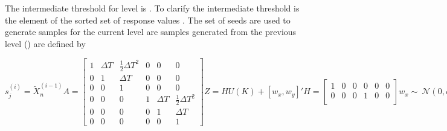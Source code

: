 \documentclass[journal]{IEEEtran}
\begin{document}
\noindent The intermediate threshold for level  is . To clarify the intermediate threshold is the  element of the sorted set of response values . The set of seeds  are used to generate samples for the current level  are samples generated from the previous level () are defined by

\begin {equation}
	s_{j}^{(i)} = \tilde{X}_{n}^{(i-1)}
\label{eq:seeds}

A = \begin{bmatrix}
	1 & \Delta T & \frac{1}{2}\Delta T^{2} & 0 & 0 & 0\\	
	0 &  1 & \Delta T & 0 & 0 & 0\\	
	0 &  0 & 1 & 0 & 0 & 0 \\
	0 &  0 & 0 & 1 & \Delta T & \frac{1}{2}\Delta T^{2} \\
	0 &  0 & 0 & 0 & 1 & \Delta T \\
	0 &  0 & 0 & 0 & 0 & 1 
\end{bmatrix}
\label{eq:transition_matrix}

	Z = HU(K) + [w_{x},w_{y}]'
	\label{eq:measurement}

H = \begin{bmatrix}
1 & 0 & 0 & 0 & 0 & 0\\	
0 & 0 & 0 & 1 & 0 & 0\\	
\end{bmatrix}
 \label{eq:measurement_matrix} 

w_{x} \sim{~} \mathcal{N}(0,\sigma_{x})
\label{eq:noise_x}

w_{y} \sim{~} \mathcal{N}(0,\sigma_{y})
\label{eq:noise_y}

\hat{U}(K+1) = A\hat{U}(K)
\label{eq:kalman_dyn}

\hat{S}(K+1) = A\hat{S}(K)A^{T} + Q
\label{eq:kalman_error_predict}

	Q = \begin{bmatrix}		
			 Q_{\sigma}\frac{\sigma_{a_{x}}^{2}}{\Delta T} & 0 \\
			 0 & Q_{\sigma}\frac{\sigma_{a_{y}}^{2}}{\Delta T}
		\end{bmatrix}

	Q_{\sigma} = \begin{bmatrix}
	\frac{1}{20}\Delta T^{5} & \frac{1}{8}\Delta T^{4} & \frac{1}{6}\Delta T^{3} \\	
	\frac{1}{8}\Delta T^{4} & \frac{1}{3}\Delta T^{3} & \frac{1}{2}\Delta T^{2} \\	
	\frac{1}{6}\Delta T^{3} & \frac{1}{2}\Delta T^{2} & \Delta T
	\end{bmatrix} 


\end{equation}
\end{document}
